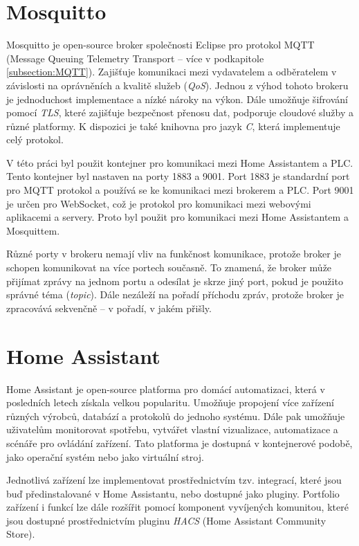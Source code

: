 \section{Mosquitto}
Mosquitto je open-source broker společnosti Eclipse pro protokol MQTT (Message Queuing Telemetry Transport – více v podkapitole \ref{subsection:MQTT}). Zajišťuje komunikaci mezi vydavatelem a odběratelem v závislosti na oprávněních a kvalitě služeb (\textit{QoS}). Jednou z výhod tohoto brokeru je jednoduchost implementace a nízké nároky na výkon. Dále umožňuje šifrování pomocí \textit{TLS}, které zajišťuje bezpečnost přenosu dat, podporuje cloudové služby a různé platformy. K dispozici je také knihovna pro jazyk \textit{C}, která implementuje celý protokol. \cite{Mosquitto}

V této práci byl použit kontejner pro komunikaci mezi Home Assistantem a PLC. Tento kontejner byl nastaven na porty 1883 a 9001. Port 1883 je standardní port pro MQTT protokol a používá se ke komunikaci mezi brokerem a PLC. Port 9001 je určen pro WebSocket, což je protokol pro komunikaci mezi webovými aplikacemi a servery. Proto byl použit pro komunikaci mezi Home Assistantem a Mosquittem.

Různé porty v brokeru nemají vliv na funkčnost komunikace, protože broker je schopen komunikovat na více portech současně. To znamená, že broker může přijímat zprávy na jednom portu a odesílat je skrze jiný port, pokud je použito správné téma (\textit{topic}). Dále nezáleží na pořadí příchodu zpráv, protože broker je zpracovává sekvenčně – v pořadí, v jakém přišly.
\section{Home Assistant}
Home Assistant je open-source platforma pro domácí automatizaci, která v posledních letech získala velkou popularitu. Umožňuje propojení více zařízení různých výrobců, databází a protokolů do jednoho systému. Dále pak umožňuje uživatelům monitorovat spotřebu, vytvářet vlastní vizualizace, automatizace a scénáře pro ovládání zařízení. Tato platforma je dostupná v kontejnerové podobě, jako operační systém nebo jako virtuální stroj. \cite{Home Assistant}

Jednotlivá zařízení lze implementovat prostřednictvím tzv. integrací, které jsou buď předinstalované v Home Assistantu, nebo dostupné jako pluginy. Portfolio zařízení i funkcí lze dále rozšířit pomocí komponent vyvíjených komunitou, které jsou dostupné prostřednictvím pluginu \textit{HACS} (Home Assistant Community Store). \cite{HACS}


